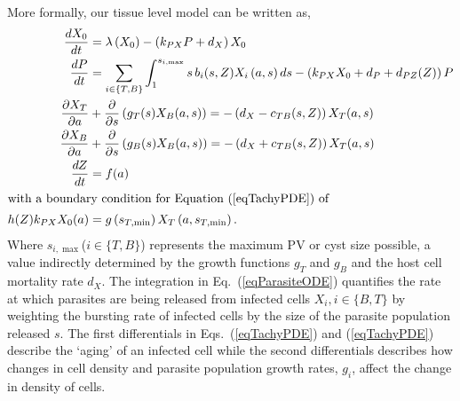 \documentclass[11pt,fleqn,letterpaper]{article}
\newcommand{\smint}{\ensuremath{s_{T,\min}}\xspace}
\newcommand{\smaxi}{\ensuremath{{s_{i,\max}}}\xspace}
\begin{document}
More formally, our tissue level model can be written as,
\begin{align*}
\frac{d X_0}{dt} &= \lambda\left(X_0\right) - \left(k_{PX} P + d_X\right) X_0\\
\frac{d P}{dt} &= \sum_{i \in \{T,B\}} \int_1^\smaxi s \, b_i(s, Z) X_i\left(a, s\right) ds - \left(k_{PX} X_0 + d_P + d_{PZ}(Z)\right) P \label{eqParsiteODE}\\
\frac{\partial X_T}{\partial a} &+ \frac{\partial }{\partial s} \left( g_T(s) X_B(a,s)\right) = - \left(d_X - c_{TB}(s, Z)\right) X_T(a,s) \label{eqTachyPDE}\\
\frac{\partial X_B}{\partial a} &+ \frac{\partial }{\partial s} \left( g_B(s) X_B(a,s)\right) = - \left(d_X + c_{TB}(s,Z)\right) X_T(a,s)\\
\frac{d Z}{dt} &=f(a)\\
\intertext{with a boundary condition for Equation (\ref{eqTachyPDE}) of}
h(Z) k_{PX} X_0(a) &= g\left(\smint\right) X_T\left(a, \smint\right).
\end{align*}
Where \smaxi ($i \in \{T,B\}$) represents the maximum PV or cyst size possible, a value indirectly determined by the growth functions $g_T$ and $g_B$ and the host cell mortality rate $d_X$.
The integration in Eq.~(\ref{eqParasiteODE}) quantifies the rate at which parasites are being released from infected cells $X_i, i \in \{B, T\}$ by weighting the bursting rate of infected cells by the size of the parasite population released $s$.
The first differentials in Eqs.~(\ref{eqTachyPDE})  and (\ref{eqTachyPDE}) describe the `aging' of an infected cell while the second differentials describes how changes in cell density and parasite population growth rates, $g_i$, affect the change in density of cells.
\end{document}
